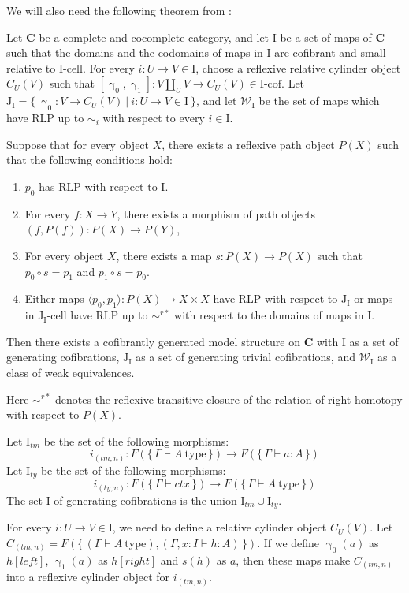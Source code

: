 \documentclass{mscs}
\newcommand{\leftI}{\mathit{left}}
\newcommand{\rightI}{\mathit{right}}
\newcommand{\cat}[1]{\mathbf{#1}}
\newcommand{\C}{\cat{C}}
\newcommand{\type}{\mathrm{type}}
\newcommand{\we}{\mathcal{W}}
\newcommand{\I}{\mathrm{I}}
\newcommand{\J}{\mathrm{J}}
\newcommand{\class}[2]{#1\text{-}\mathrm{#2}}
\newcommand{\Icell}[1][\I]{\class{#1}{cell}}
\newcommand{\Icof}[1][\I]{\class{#1}{cof}}
\newcommand{\Jcell}[1][]{\Icell[\J#1]}
\newcommand{\cyli}{\upgamma}
\numberwithin{figure}{section}
\begin{document}
We will also need the following theorem from \cite{f-model-structures}:
\begin{thm}
Let $\C$ be a complete and cocomplete category, and let $\I$ be a set of maps of $\C$
such that the domains and the codomains of maps in $\I$ are cofibrant and small relative to $\Icell$.
For every $i : U \to V \in \I$, choose a reflexive relative cylinder object $C_U(V)$
such that $[\cyli_0,\cyli_1] : V \amalg_U V \to C_U(V) \in \Icof$.
Let $\J_\I = \{\ \cyli_0 : V \to C_U(V)\ |\ i : U \to V \in \I \ \}$, and
let $\we_\I$ be the set of maps which have RLP up to $\sim_i$ with respect to every $i \in \I$.

Suppose that for every object $X$, there exists a reflexive path object $P(X)$ such that the following conditions hold:
\begin{enumerate}
\item $p_0$ has RLP with respect to $\I$.
\item For every $f : X \to Y$, there exists a morphism of path objects $(f,P(f)) : P(X) \to P(Y)$,
\item For every object $X$, there exists a map $s : P(X) \to P(X)$ such that $p_0 \circ s = p_1$ and $p_1 \circ s = p_0$.
\item Either maps $\langle p_0, p_1 \rangle : P(X) \to X \times X$ have RLP with respect to $\J_\I$
or maps in $\Jcell[_\I]$ have RLP up to $\sim^{r*}$ with respect to the domains of maps in $\I$.
\end{enumerate}
Then there exists a cofibrantly generated model structure on $\C$ with $\I$ as a set of generating cofibrations,
$\J_\I$ as a set of generating trivial cofibrations, and $\we_\I$ as a class of weak equivalences.
\end{thm}
Here $\sim^{r*}$ denotes the reflexive transitive closure of the relation of right homotopy with respect to $P(X)$.

Let $\I_{tm}$ be the set of the following morphisms:
\[ i_{(tm,n)} : F(\{\,\Gamma \vdash A\ \type\,\}) \to F(\{\,\Gamma \vdash a : A\,\}) \]
Let $\I_{ty}$ be the set of the following morphisms:
\[ i_{(ty,n)} : F(\{\,\Gamma \vdash ctx\,\}) \to F(\{\,\Gamma \vdash A\ \type\,\}) \]
The set $\I$ of generating cofibrations is the union $\I_{tm} \cup \I_{ty}$.

For every $i : U \to V \in \I$, we need to define a relative cylinder object $C_U(V)$.
Let $C_{(tm,n)} = F(\{\,(\Gamma \vdash A\ \type), (\Gamma, x : I \vdash h : A)\,\})$.
If we define $\cyli_0(a)$ as $h[\leftI]$, $\cyli_1(a)$ as $h[\rightI]$ and $s(h)$ as $a$,
then these maps make $C_{(tm,n)}$ into a reflexive cylinder object for $i_{(tm,n)}$.
\end{document}
